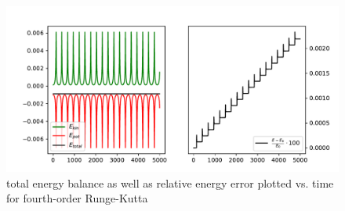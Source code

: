     \begin{figure}[h!]
        \centering
        \includegraphics[width=\textwidth]{./figures/task1_1_energies_rk4.pdf}
        \caption{total energy balance as well as relative energy error plotted 
            vs. time for fourth-order Runge-Kutta}
    \end{figure} \ \\ 
